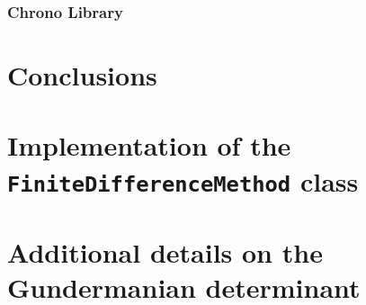 \documentclass[12pt, oneside]{book}
\theoremstyle{plain}
\theoremstyle{definition}
\begin{document}
\subsection{Chrono Library}



\chapter{Conclusions}


\appendix
\chapter{Implementation of the {\tt FiniteDifferenceMethod} class}
\lipsum[10]
\chapter[shorter running title]{Additional details on the Gundermanian determinant}
\lipsum[10]


    



\end{document}
